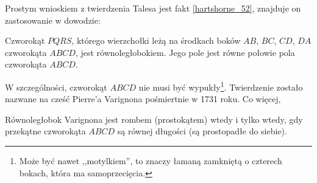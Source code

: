 Prostym wnioskiem z twierdzenia Talesa jest fakt \ref{hartshorne_52}, znajduje on zastosowanie w dowodzie:

\begin{theorem}[Varignona]
    Czworokąt $PQRS$, którego wierzchołki leżą na środkach boków $AB$, $BC$, $CD$, $DA$ czworokąta $ABCD$, jest równoległobokiem.
    Jego pole jest równe połowie pola czworokąta $ABCD$. %
\end{theorem}

W szczególności, czworokąt $ABCD$ nie musi być wypukły\footnote{Może być nawet ,,motylkiem'', to znaczy łamaną zamkniętą o czterech bokach, która ma samoprzecięcia.}.
Twierdzenie zostało nazwane na cześć Pierre'a Varignona pośmiertnie w 1731 roku.
%
Co więcej,

\begin{proposition}
    Równoległobok Varignona jest rombem (prostokątem) wtedy i tylko wtedy, gdy przekątne czworokąta $ABCD$ są równej długości (są prostopadłe do siebie).
%
%
%
\end{proposition}

%